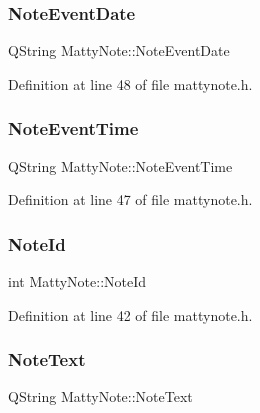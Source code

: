 \subsubsection{\texorpdfstring{Note\+Event\+Date}{NoteEventDate}}
{\footnotesize\ttfamily Q\+String Matty\+Note\+::\+Note\+Event\+Date\hspace{0.3cm}{\ttfamily [private]}}



Definition at line 48 of file mattynote.\+h.

\hypertarget{classMattyNote_a3e69ae7fb7c8c616594a9647c14a192e}{}\label{classMattyNote_a3e69ae7fb7c8c616594a9647c14a192e} 
\subsubsection{\texorpdfstring{Note\+Event\+Time}{NoteEventTime}}
{\footnotesize\ttfamily Q\+String Matty\+Note\+::\+Note\+Event\+Time\hspace{0.3cm}{\ttfamily [private]}}



Definition at line 47 of file mattynote.\+h.

\hypertarget{classMattyNote_a15a3c21ef00e8c629aeb58025121b0a9}{}\label{classMattyNote_a15a3c21ef00e8c629aeb58025121b0a9} 
\subsubsection{\texorpdfstring{Note\+Id}{NoteId}}
{\footnotesize\ttfamily int Matty\+Note\+::\+Note\+Id\hspace{0.3cm}{\ttfamily [private]}}



Definition at line 42 of file mattynote.\+h.

\hypertarget{classMattyNote_ab54fa825ed3ce8081befdb0c391d682b}{}\label{classMattyNote_ab54fa825ed3ce8081befdb0c391d682b} 
\subsubsection{\texorpdfstring{Note\+Text}{NoteText}}
{\footnotesize\ttfamily Q\+String Matty\+Note\+::\+Note\+Text\hspace{0.3cm}{\ttfamily [private]}}



